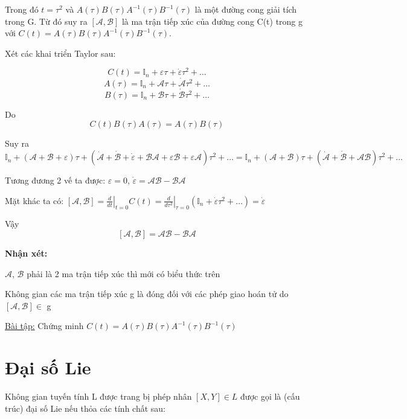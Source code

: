 \documentclass{report}
\begin{document}
Trong đó \( t = \tau^{2} \) và \( A(\tau)B(\tau)A^{-1}(\tau)B^{-1}(\tau) \) là một đường cong giải tích trong G. Từ đó suy ra \( [\mathcal{A}, \mathcal{B}] \) là ma trận tiếp xúc của đường cong C(t) trong g với \( C(t) =  A(\tau)B(\tau)A^{-1}(\tau)B^{-1}(\tau) \).

Xét các khai triển Taylor sau:

\[ C(t) = \mathbb{I}_{n} + \varepsilon \tau + \dot{\varepsilon} \tau^{2} + \dots \]
\[ A(\tau) = \mathbb{I}_{n} + \mathcal{A} \tau + \dot{\mathcal{A}} \tau^{2} + \dots \]
\[ B(\tau) = \mathbb{I}_{n} + \mathcal{B} \tau + \dot{\mathcal{B}} \tau^{2} + \dots \]

Do \[ C(t)B(\tau)A(\tau) = A(\tau)B(\tau) \]
 
Suy ra \[ \mathbb{I}_{n} + ( \mathcal{A} + \mathcal{B} + \varepsilon ) \tau + ( \dot{\mathcal{A}} + \dot{\mathcal{B}} + \dot{\varepsilon} + \mathcal{B} \mathcal{A} +  \varepsilon \mathcal{B} + \varepsilon \mathcal{A} ) \tau^{2} + \dots = \mathbb{I}_{n} + ( \mathcal{A} + \mathcal{B} ) \tau + ( \dot{\mathcal{A}} + \dot{\mathcal{B}} + \mathcal{A} \mathcal{B} ) \tau^{2} + \dots \]
 
Tương đương 2 vế ta được: \( \varepsilon = 0 \), \( \dot{\varepsilon} = \mathcal{A} \mathcal{B} - \mathcal{B} \mathcal{A} \)

Mặt khác ta có: \( [\mathcal{A}, \mathcal{B}] = \left. {\frac{d}{dt}} \right|_{t=0} C(t) = \left. {\frac{d}{d \tau^{2}}} \right|_{\tau=0} ( \mathbb{I}_{n} + \dot{\varepsilon} \tau^{2} + \dots ) = \dot{\varepsilon} \)

Vậy \[ [\mathcal{A}, \mathcal{B}] = \mathcal{A} \mathcal{B} - \mathcal{B} \mathcal{A} \]

\textbf{Nhận xét:} 

\( \mathcal{A} \), \(\mathcal{B} \) phải là 2 ma trận tiếp xúc thì mới có biểu thức trên

Không gian các ma trận tiếp xúc g là đóng đối với các phép giao hoán tử do \( [\mathcal{A}, \mathcal{B}] \in \) g

\underline{Bài tập:} Chứng minh \( C(t) =  A(\tau)B(\tau)A^{-1}(\tau)B^{-1}(\tau) \)

\section{Đại số Lie}

Không gian tuyến tính L được trang bị phép nhân \( [X,Y] \in L \) được gọi là (cấu trúc) đại số Lie nếu thỏa các tính chất sau: 
 
\end{document}

